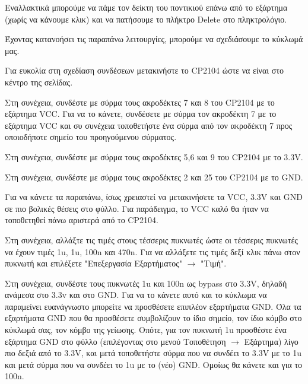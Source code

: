 \documentclass[a4paper]{article}
\begin{document}
Εναλλακτικά μπορούμε να πάμε τον δείκτη του ποντικιού επάνω από το εξάρτημα (χωρίς να κάνουμε κλικ) και να πατήσουμε το πλήκτρο Delete στο πληκτρολόγιο.

Έχοντας κατανοήσει τις παραπάνω λειτουργίες, μπορούμε να σχεδιάσουμε το κύκλωμά μας.

Για ευκολία στη σχεδίαση συνδέσεων μετακινήστε το \textenglish{CP2104} ώστε να είναι στο κέντρο της σελίδας.

Στη συνέχεια, συνδέστε με σύρμα τους ακροδέκτες 7 και 8 του \textenglish{CP2104} με το εξάρτημα VCC. Για να το κάνετε, συνδέσετε με σύρμα τον ακροδέκτη 7 με το εξάρτημα VCC και συ συνέχεια τοποθετήστε ένα σύρμα από τον  ακροδέκτη 7 προς οποιοδήποτε σημείο του προηγούμενου σύρματος.

Στη συνέχεια, συνδέστε με σύρμα τους ακροδέκτες 5,6 και 9 του \textenglish{CP2104} με το 3.3V.

Στη συνέχεια, συνδέστε με σύρμα τους ακροδέκτες 2 και 25 του \textenglish{CP2104} με το GND.

\begin{figure}
  \begin{center}
    \label{fig:kicad-main}
  \end{center}
\end{figure}

Για να κάνετε τα παραπάνω, ίσως χρειαστεί να μετακινήσετε τα VCC, 3.3V και GND σε πιο βολικές θέσεις στο φύλλο. Για παράδειγμα, το VCC καλό θα ήταν να τοποθετηθεί πάνω αριστερά από το \textenglish{CP2104}.

\begin{figure}
  \begin{center}
    \label{fig:kicad-main}
  \end{center}
\end{figure}

Στη συνέχεια, αλλάξτε τις τιμές στους τέσσερις πυκνωτές ώστε οι τέσσερις πυκνωτές να έχουν τιμές 1u, 1u, 100n και 470n. Για να αλλάξετε τις τιμές δεξί κλικ πάνω στον πυκνωτή και επιλέξετε "Επεξεργασία Εξαρτήματος" $\rightarrow$ "Τιμή".

Στη συνέχεια, συνδέστε τους πυκνωτές 1u και 100n ως bypass στο 3.3V, δηλαδή ανάμεσα στο 3.3v και στο GND. Για να το κάνετε αυτό και το κύκλωμα να παραμείνει ευανάγνωστο μπορείτε να προσθέσετε επιπλέον εξαρτήματα GND. Όλα τα εξαρτήματα GND που θα προσθέσετε συμβολίζουν το ίδιο σημείο, τον ίδιο κόμβο στο κύκλωμά σας, τον κόμβο της γείωσης. Οπότε, για τον πυκνωτή 1u προσθέστε ένα εξάρτημα GND στο φύλλο (επιλέγοντας στο μενού Τοποθέτηση $\rightarrow$ Εξάρτημα) λίγο πιο δεξιά από το 3.3V, και μετά τοποθετήστε σύρμα που να συνδέει το 3.3V με το 1u και μετά σύρμα που να συνδέει το 1u με το (νέο) GND. Ομοίως θα κάνετε και για το 100n.
\end{document}
